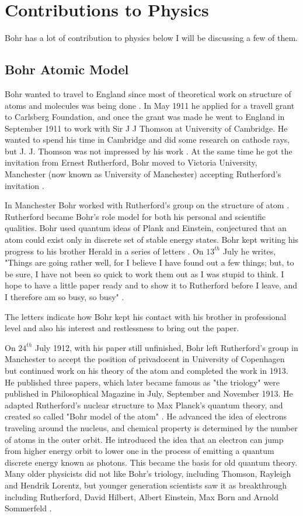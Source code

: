 \documentclass[11pt, article]{scrartcl}
\begin{document}
\section{Contributions to Physics} %
    Bohr has a lot of contribution to physics below I will be discussing a few of them.
\subsection {Bohr Atomic Model}
	Bohr wanted to travel to England since most of theoretical work on structure of atoms and molecules was being done \cite{atommodel}. In May 1911 he applied for a travell
	grant to Carlsberg Foundation, and once the grant was made he went to England in September 1911 to work with Sir J J Thomson at University of Cambridge.
	He wanted to spend his time in Cambridge and did some research on cathode rays, but J. J. Thomson was not impressed by his work \cite{love}. At the same time he got the
	invitation from Ernest Rutherford, Bohr moved to Victoria University, Manchester (now known as University of Manchester) accepting Rutherford's invitation \cite{model}.

	In Manchester Bohr worked with Rutherford's group on the structure of atom \cite{kennedy}.
	Rutherford became Bohr's role model for both his personal and scientific
	qualities. Bohr used quantum ideas of Plank and Einstein, conjectured that an atom could exist only in discrete set of stable energy states. Bohr kept
	writing his progress to his brother Herald in a series of letters \cite{archives}. On $13^{th}$ July he writes, 
	"Things are going rather well, for I believe I have found out a few things; but, to be sure, I have not been so quick to work them out as I was stupid to think. 
	I hope to have a little paper ready and to show it to Rutherford before I leave, and I therefore am so busy, so busy" \cite{kennedy}. 

	The letters indicate how Bohr kept his contact with his brother in professional level and also his interest and restlessness to bring out the paper.

	On $24^{th}$  July 1912, with his paper still unfinished, Bohr left Rutherford's group in Manchester to accept the position of privadocent in University of 
	Copenhagen but continued work on his theory of the atom and completed the work in 1913. He published three papers, which later became famous as
	"the triology" \cite{kennedy} were published in Philosophical Magazine in July, September and November 1913. He adapted Rutherford's nuclear structure to Max
	Planck's quantum theory, and created so called "Bohr model of the atom" \cite{atom}. He advanced the idea of electrons traveling around the nucleus, and
	chemical property is determined by the number of atoms in the outer orbit. He introduced the idea that an electron can jump from higher energy 
	orbit to lower one in the process of emitting a quantum discrete energy known as photons. This became the basis for old quantum theory. 
	Many older physicists did not like Bohr's triology, including Thomson, Rayleigh and Hendrik Lorentz, but younger generation scientists saw it as 
	breakthrough including  Rutherford, David Hilbert, Albert Einstein, Max Born and Arnold Sommerfeld \cite{bomb2}. 
\end{document}
